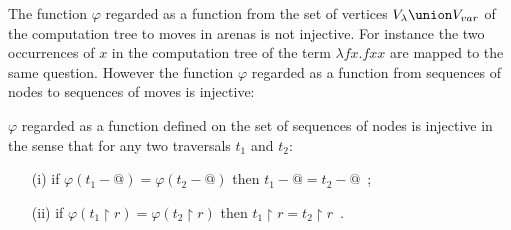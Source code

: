 The function $\varphi$ regarded as a function from the set of vertices $V_\lambda \union V_{var}$ of the computation tree to moves in arenas is not injective.
For instance the two occurrences of $x$ in the computation tree of the term $\lambda f x. f x x$ are mapped to the same question. However
the function $\varphi$ regarded as a function from sequences of nodes to sequences of moves is injective:
\begin{lem}
\label{lem:varphiinjective}
$\varphi$ regarded as a function defined on the set of
sequences of nodes is injective in the sense that for any two traversals $t_1$ and $t_2$:
\begin{itemize}
\item[(i)] if $\varphi (t_1 - @ ) = \varphi (t_2 - @ )$ then $t_1-@ =t_2 -@$\ ;
\item[(ii)] if $\varphi (t_1 \upharpoonright r ) = \varphi (t_2 \upharpoonright r )$ then $t_1\upharpoonright r = t_2\upharpoonright r$\ .
\end{itemize}
\end{lem}
